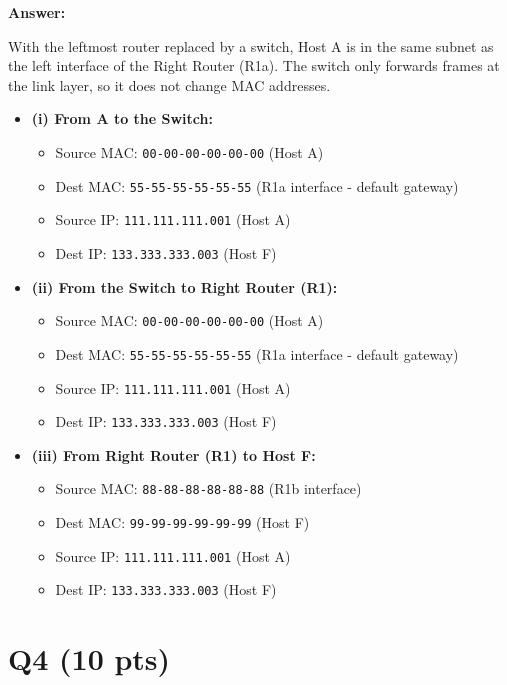 \documentclass[12pt, letterpaper]{article}
\newcommand{\answer}{\noindent\textbf{Answer:}\par\vspace{0.5em}}
\begin{document}
\answer
With the leftmost router replaced by a switch, Host A is in the same subnet as the left interface of the Right Router (R1a). The switch only forwards frames at the link layer, so it does not change MAC addresses.
\begin{itemize}
    \item \textbf{(i) From A to the Switch:}
    \begin{itemize}
        \item Source MAC: \texttt{00-00-00-00-00-00} (Host A)
        \item Dest MAC: \texttt{55-55-55-55-55-55} (R1a interface - default gateway)
        \item Source IP: \texttt{111.111.111.001} (Host A)
        \item Dest IP: \texttt{133.333.333.003} (Host F)
    \end{itemize}
    \item \textbf{(ii) From the Switch to Right Router (R1):}
    \begin{itemize}
        \item Source MAC: \texttt{00-00-00-00-00-00} (Host A)
        \item Dest MAC: \texttt{55-55-55-55-55-55} (R1a interface - default gateway)
        \item Source IP: \texttt{111.111.111.001} (Host A)
        \item Dest IP: \texttt{133.333.333.003} (Host F)
    \end{itemize}
    \item \textbf{(iii) From Right Router (R1) to Host F:}
    \begin{itemize}
        \item Source MAC: \texttt{88-88-88-88-88-88} (R1b interface)
        \item Dest MAC: \texttt{99-99-99-99-99-99} (Host F)
        \item Source IP: \texttt{111.111.111.001} (Host A)
        \item Dest IP: \texttt{133.333.333.003} (Host F)
    \end{itemize}
\end{itemize}

\section*{Q4 (10 pts)}
\end{document}
